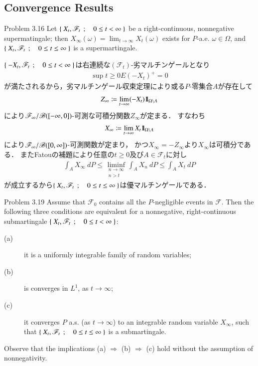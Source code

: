 \subsection{Convergence Results}
	\begin{itembox}[l]{Problem 3.16}
		Let $\left\{\ X_t,\mathscr{F}_t\ \, ; \quad 0 \leq t < \infty\ \right\}$ be a right-continuous, nonnegative
		supermatingale; then $X_\infty(\omega) = \lim_{t \to \infty} X_t(\omega)$ exists for
		$P$-a.e. $\omega \in \Omega$, and $\left\{\ X_t,\mathscr{F}_t\ \, ; \quad 0 \leq t \leq \infty\ \right\}$ is a supermartingale.
	\end{itembox}
	
	\begin{prf}
		$\left\{\ -X_t,\mathscr{F}_t\ \, ; \quad 0 \leq t < \infty\ \right\}$は右連続な$(\mathscr{F}_t)$-劣マルチンゲールとなり
		\begin{align}
			\sup{t \geq 0}{E(-X_t)^+} = 0
		\end{align}
		が満たされるから，劣マルチンゲール収束定理により或る$P$-零集合$A$が存在して
		\begin{align}
			Z_\infty \coloneqq \lim_{t \to \infty} (-X_t)\mbox{1}\hspace{-0.25em}\mbox{l}_{\Omega \backslash A}
		\end{align}
		により$\mathscr{F}_\infty/\mathscr{B}([-\infty,0])$-可測な可積分関数$Z_\infty$が定まる．
		すなわち
		\begin{align}
			X_\infty \coloneqq \lim_{t \to \infty} X_t\mbox{1}\hspace{-0.25em}\mbox{l}_{\Omega \backslash A}
		\end{align}
		により$\mathscr{F}_\infty/\mathscr{B}([0,\infty])$-可測関数が定まり，
		かつ$X_\infty = -Z_\infty$より$X_\infty$は可積分である．
		またFatouの補題により任意の$t \geq 0$及び$A \in \mathscr{F}_t$に対し
		\begin{align}
			\int_A X_\infty\ dP \leq \liminf_{\substack{n \to \infty \\ n > t}} \int_A X_n\ dP \leq \int_A X_t\ dP
		\end{align}
		が成立するから$\left\{\ X_t,\mathscr{F}_t\ \, ; \quad 0 \leq t \leq \infty\ \right\}$は優マルチンゲールである．
		\QED
	\end{prf}
	
	\begin{itembox}[l]{Problem 3.19}
		Assume that $\mathscr{F}_0$ contains all the $P$-negligible events in $\mathscr{F}$.
		Then the following three conditions are equivalent for a nonnegative, right-continuous 
		submartingale $\left\{\ X_t,\mathscr{F}_t\ \, ; \quad 0 \leq t < \infty\ \right\}$:
		\begin{description}
			\item[(a)] it is a uniformly integrable family of random variables;
			\item[(b)] is converges in $L^1$, as $t \to \infty$;
			\item[(c)] it converges $P$ a.s. (as $t \to \infty$) to an integrable random variable $X_\infty$,
			such that $\left\{\ X_t,\mathscr{F}_t\ \, ; \quad 0 \leq t \leq \infty\ \right\}$ is a submartingale.
		\end{description}
		Observe that the implications (a) $\Rightarrow$ (b) $\Rightarrow$ (c) hold without the assumption of nonnegativity. 
	\end{itembox}
	
